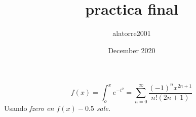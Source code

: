 \documentclass{article}
\title{practica final}
\author{alatorre2001 }
\date{December 2020}
\begin{document}
\maketitle

\section{}

$$
f(x)=\int_o^x e^{-t^2} = \sum_{n=0}^\infty \frac{(-1)^n x^{2n+1}}{n! (2n+1)}
$$
Usando  \it{fzero} en $f(x)-0.5$ sale.
\end{document}

